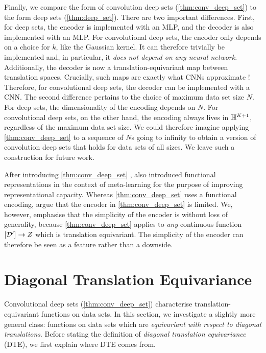 \documentclass[12pt, twoside]{report}
\begin{document}
Finally, we compare the form of convolution deep sets (\cref{thm:conv_deep_set}) to the form deep sets (\cref{thm:deep_set}).
There are two important differences.
First, for deep sets, the encoder is implemented with an MLP, and the decoder is also implemented with an MLP.
For convolutional deep sets, the encoder only depends on a choice for $k$, like the Gaussian kernel.
It can therefore trivially be implemented and, in particular, it \emph{does not depend on any neural network}.
Additionally, the decoder is now a translation-equivariant map between translation spaces.
Crucially, such maps are exactly what CNNs approximate \parencite[Theorem 3.1;][]{Yarotsky:2022:Universal_Approximations_of_Invariant_Maps}!
Therefore, for convolutional deep sets, the decoder can be implemented with a CNN.
The second difference pertains to the choice of maximum data set size $N$.
For deep sets, the dimensionality of the encoding depends on $N$.
For convolutional deep sets, on the other hand, the encoding always lives in $\mathbb{H}^{K+1}$, regardless of the maximum data set size.
We could therefore imagine applying \cref{thm:conv_deep_set} to a sequence of $N$s going to infinity to obtain a version of convolution deep sets that holds for data sets of all sizes.
We leave such a construction for future work.

After introducing \cref{thm:conv_deep_set} \parencite{Gordon:2020:Convolutional_Conditional_Neural_Processes}, \textcite{Xu:2020:MetaFun_Meta-Learning_With_Iterative_Functional} also introduced functional representations in the context of meta-learning for the purpose of improving representational capacity.
Whereas \cref{thm:conv_deep_set} uses a functional encoding, \citeauthor{Xu:2020:MetaFun_Meta-Learning_With_Iterative_Functional} argue that the encoder in \cref{thm:conv_deep_set} is limited.
We, however, emphasise that the simplicity of the encoder is without loss of generality, because \cref{thm:conv_deep_set} applies to \emph{any} continuous function $[\mathcal{D}'] \to Z$ which is translation equivariant.
The simplicity of the encoder can therefore be seen as a feature rather than a downside.

\section{Diagonal Translation Equivariance}
\label{sec:repr_theorems:conv_deep_sets_dte}

Convolutional deep sets (\cref{thm:conv_deep_set}) characterise translation-equivariant functions on data sets.
In this section, we investigate a slightly more general class:
functions on data sets which are \emph{equivariant with respect to diagonal translations}.
Before stating the definition of \emph{diagonal translation equivariance} (DTE), we first explain where DTE comes from.
\end{document}
